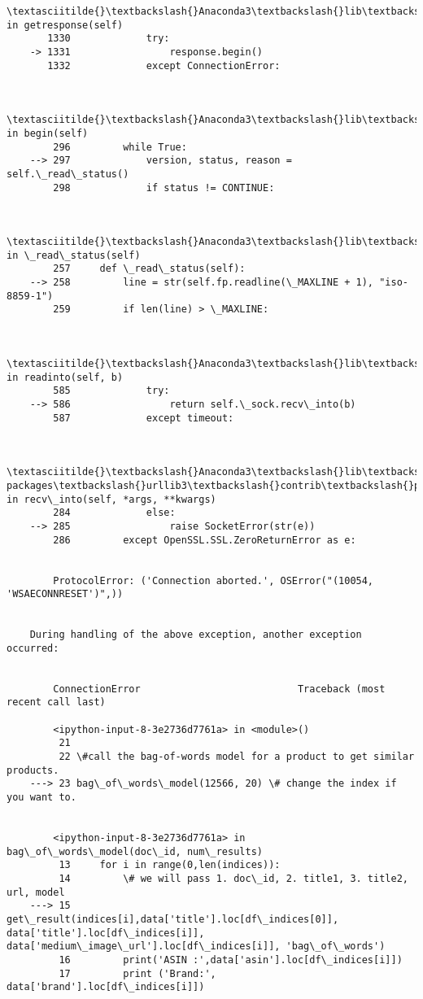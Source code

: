 \documentclass[11pt]{article}
\begin{document}
\begin{Verbatim}[commandchars=\\\{\}]
        \textasciitilde{}\textbackslash{}Anaconda3\textbackslash{}lib\textbackslash{}http\textbackslash{}client.py in getresponse(self)
       1330             try:
    -> 1331                 response.begin()
       1332             except ConnectionError:
    

        \textasciitilde{}\textbackslash{}Anaconda3\textbackslash{}lib\textbackslash{}http\textbackslash{}client.py in begin(self)
        296         while True:
    --> 297             version, status, reason = self.\_read\_status()
        298             if status != CONTINUE:
    

        \textasciitilde{}\textbackslash{}Anaconda3\textbackslash{}lib\textbackslash{}http\textbackslash{}client.py in \_read\_status(self)
        257     def \_read\_status(self):
    --> 258         line = str(self.fp.readline(\_MAXLINE + 1), "iso-8859-1")
        259         if len(line) > \_MAXLINE:
    

        \textasciitilde{}\textbackslash{}Anaconda3\textbackslash{}lib\textbackslash{}socket.py in readinto(self, b)
        585             try:
    --> 586                 return self.\_sock.recv\_into(b)
        587             except timeout:
    

        \textasciitilde{}\textbackslash{}Anaconda3\textbackslash{}lib\textbackslash{}site-packages\textbackslash{}urllib3\textbackslash{}contrib\textbackslash{}pyopenssl.py in recv\_into(self, *args, **kwargs)
        284             else:
    --> 285                 raise SocketError(str(e))
        286         except OpenSSL.SSL.ZeroReturnError as e:
    

        ProtocolError: ('Connection aborted.', OSError("(10054, 'WSAECONNRESET')",))

        
    During handling of the above exception, another exception occurred:
    

        ConnectionError                           Traceback (most recent call last)

        <ipython-input-8-3e2736d7761a> in <module>()
         21 
         22 \#call the bag-of-words model for a product to get similar products.
    ---> 23 bag\_of\_words\_model(12566, 20) \# change the index if you want to.
    

        <ipython-input-8-3e2736d7761a> in bag\_of\_words\_model(doc\_id, num\_results)
         13     for i in range(0,len(indices)):
         14         \# we will pass 1. doc\_id, 2. title1, 3. title2, url, model
    ---> 15         get\_result(indices[i],data['title'].loc[df\_indices[0]], data['title'].loc[df\_indices[i]], data['medium\_image\_url'].loc[df\_indices[i]], 'bag\_of\_words')
         16         print('ASIN :',data['asin'].loc[df\_indices[i]])
         17         print ('Brand:', data['brand'].loc[df\_indices[i]])
    


\end{Verbatim}
\end{document}
